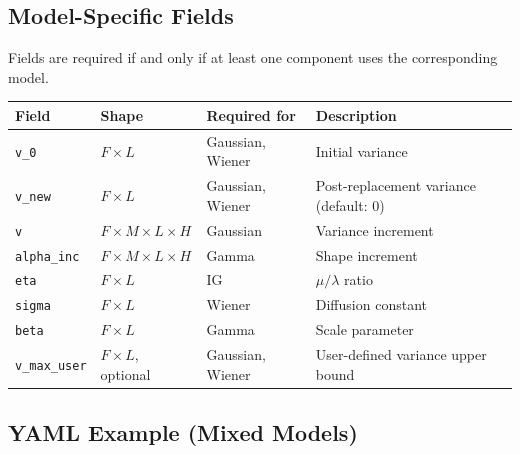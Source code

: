 \documentclass[11pt,a4paper]{article}
\begin{document}
\subsection{Model-Specific Fields}

Fields are required if and only if at least one component uses the corresponding model.

\begin{longtable}{@{}lllp{5.5cm}@{}}
\toprule
Field & Shape & Required for & Description \\
\midrule
\texttt{v\_0} & $F \times L$ & Gaussian, Wiener & Initial variance \\
\texttt{v\_new} & $F \times L$ & Gaussian, Wiener & Post-replacement variance (default: 0) \\
\texttt{v} & $F \times M \times L \times H$ & Gaussian & Variance increment \\
\texttt{alpha\_inc} & $F \times M \times L \times H$ & Gamma & Shape increment \\
\texttt{eta} & $F \times L$ & IG & $\mu/\lambda$ ratio \\
\texttt{sigma} & $F \times L$ & Wiener & Diffusion constant \\
\texttt{beta} & $F \times L$ & Gamma & Scale parameter \\
\texttt{v\_max\_user} & $F \times L$, optional & Gaussian, Wiener &
  User-defined variance upper bound \\
\bottomrule
\end{longtable}

\subsection{YAML Example (Mixed Models)}
\end{document}
